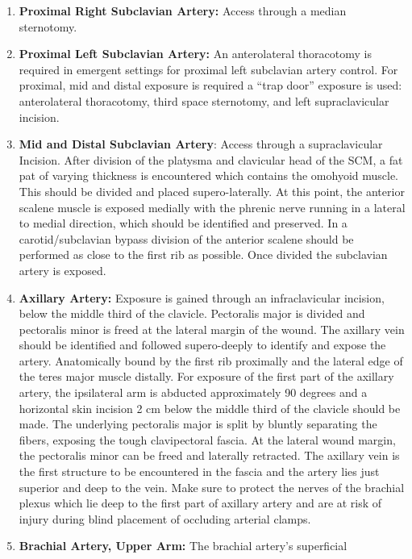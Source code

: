\documentclass[
]{book}
\begin{document}
\begin{enumerate}
\def\labelenumi{\arabic{enumi}.}
\item
  \textbf{Proximal Right Subclavian Artery:} Access through a median
  sternotomy.
\item
  \textbf{Proximal Left Subclavian Artery:} An anterolateral thoracotomy is
  required in emergent settings for proximal left subclavian artery
  control. For proximal, mid and distal exposure is required a ``trap
  door'' exposure is used: anterolateral thoracotomy, third space
  sternotomy, and left supraclavicular incision.
\item
  \textbf{Mid and Distal Subclavian Artery}: Access through a
  supraclavicular Incision. After division of the platysma and
  clavicular head of the SCM, a fat pat of varying thickness is
  encountered which contains the omohyoid muscle. This should be
  divided and placed supero-laterally. At this point, the anterior
  scalene muscle is exposed medially with the phrenic nerve running in
  a lateral to medial direction, which should be identified and
  preserved. In a carotid/subclavian bypass division of the anterior
  scalene should be performed as close to the first rib as possible.
  Once divided the subclavian artery is exposed.
\item
  \textbf{Axillary Artery:} Exposure is gained through an infraclavicular
  incision, below the middle third of the clavicle. Pectoralis major
  is divided and pectoralis minor is freed at the lateral margin of
  the wound. The axillary vein should be identified and followed
  supero-deeply to identify and expose the artery. Anatomically bound
  by the first rib proximally and the lateral edge of the teres major
  muscle distally. For exposure of the first part of the axillary
  artery, the ipsilateral arm is abducted approximately 90 degrees and
  a horizontal skin incision 2 cm below the middle third of the
  clavicle should be made. The underlying pectoralis major is split by
  bluntly separating the fibers, exposing the tough clavipectoral
  fascia. At the lateral wound margin, the pectoralis minor can be
  freed and laterally retracted. The axillary vein is the first
  structure to be encountered in the fascia and the artery lies just
  superior and deep to the vein. Make sure to protect the nerves of
  the brachial plexus which lie deep to the first part of axillary
  artery and are at risk of injury during blind placement of occluding
  arterial clamps.
\item
  \textbf{Brachial Artery, Upper Arm:} The brachial artery's superficial

\end{enumerate}
\end{document}
